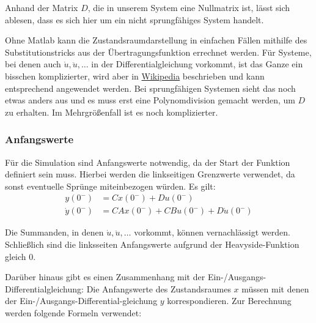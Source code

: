 Anhand der Matrix $D$, die in unserem System eine Nullmatrix ist, lässt sich ablesen, dass es sich hier um ein nicht sprungfähiges System handelt.

Ohne Matlab kann die Zustandsraumdarstellung in einfachen Fällen mithilfe des Substitutionstricks aus der Übertragungsfunktion errechnet werden. Für Systeme, bei denen auch $\dot u, \ddot u, \ldots$ in der Differentialgleichung vorkommt, ist das Ganze ein bisschen komplizierter, wird aber in \href{https://de.wikipedia.org/wiki/Zustandsraumdarstellung#Regelungsnormalform}{Wikipedia} beschrieben und kann entsprechend angewendet werden. Bei sprungfähigen Systemen sieht das noch etwas anders aus und es muss erst eine Polynomdivision gemacht werden, um $D$ zu erhalten. Im Mehrgrößenfall ist es noch komplizierter.

\subsubsection*{Anfangswerte}

Für die Simulation sind Anfangswerte notwendig, da der Start der Funktion definiert sein muss. Hierbei werden die linkseitigen Grenzwerte verwendet, da sonst eventuelle Sprünge miteinbezogen würden. Es gilt:
\begin{align*}
    y(0^-) & = Cx(0^-) + Du(0^-) \\
    \dot y(0^-) & = CAx(0^-) + CBu(0^-) + D \dot u (0^-)
\end{align*}

Die Summanden, in denen $\dot u, \ddot u, \ldots$ vorkommt, können vernachlässigt werden. Schließlich sind die linksseiten Anfangswerte aufgrund der Heavyside-Funktion gleich 0.

Darüber hinaus gibt es einen Zusammenhang mit der Ein-/Ausgangs-Differentialgleichung: Die Anfangswerte des Zustandsraumes $x$ müssen mit denen der Ein-/Ausgangs-Differential-gleichung $y$ korrespondieren. Zur Berechnung werden folgende Formeln verwendet:

